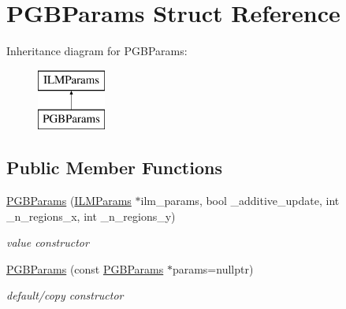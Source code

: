 \hypertarget{structPGBParams}{\section{P\-G\-B\-Params Struct Reference}
\label{structPGBParams}
}
Inheritance diagram for P\-G\-B\-Params\-:\begin{figure}[H]
\begin{center}
\leavevmode
\includegraphics[height=2.000000cm]{structPGBParams}
\end{center}
\end{figure}
\subsection*{Public Member Functions}
\begin{DoxyCompactItemize}
\item 
\hypertarget{structPGBParams_adf3d8cfd55b41d282e19e8a43f567481}{\hyperlink{structPGBParams_adf3d8cfd55b41d282e19e8a43f567481}{P\-G\-B\-Params} (\hyperlink{structILMParams}{I\-L\-M\-Params} $\ast$ilm\-\_\-params, bool \-\_\-additive\-\_\-update, int \-\_\-n\-\_\-regions\-\_\-x, int \-\_\-n\-\_\-regions\-\_\-y)}\label{structPGBParams_adf3d8cfd55b41d282e19e8a43f567481}

\begin{DoxyCompactList}\small\item\em value constructor \end{DoxyCompactList}\item 
\hypertarget{structPGBParams_a87db89e730a9bf2f2a9f25edaed406f3}{\hyperlink{structPGBParams_a87db89e730a9bf2f2a9f25edaed406f3}{P\-G\-B\-Params} (const \hyperlink{structPGBParams}{P\-G\-B\-Params} $\ast$params=nullptr)}\label{structPGBParams_a87db89e730a9bf2f2a9f25edaed406f3}

\begin{DoxyCompactList}\small\item\em default/copy constructor \end{DoxyCompactList}\end{DoxyCompactItemize}
